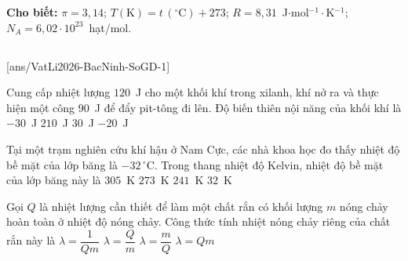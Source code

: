 \def\CheDo{solcolor}%
\def\tenchuong{Sở GD\&ĐT Bắc Ninh}
\def\thuonghieu{VẬT LÍ 12 -- Eduzy.com.vn}
\def\TachCauDS{1}
\def\TachCauLG{1}




	\noindent\textbf{Cho biết:} $\pi=3{,}14$; $T(\text{K})=t\,(^\circ\text{C})+273$; $R=8{,}31$~J$\cdot$mol$^{-1}\cdot$K$^{-1}$; $N_A=6{,}02\cdot 10^{23}$~hạt/mol.

	\noindent
	\subsection*{}
	\setcounter{ex}{0}
	[ans/VatLi2026-BacNinh-SoGD-1]

	\begin{ex}%
		Cung cấp nhiệt lượng $120$~J cho một khối khí trong xilanh, khí nở ra và thực hiện một công $90$~J để đẩy pit-tông đi lên. Độ biến thiên nội năng của khối khí là
		\choice
		{$-30$~J}
		{$210$~J}
		{\True $30$~J}
		{$-20$~J}
	\end{ex}

	\begin{ex}%
		Tại một trạm nghiên cứu khí hậu ở Nam Cực, các nhà khoa học đo thấy nhiệt độ bề mặt của lớp băng là $-32\,^\circ\text{C}$. Trong thang nhiệt độ Kelvin, nhiệt độ bề mặt của lớp băng này là
		\choice
		{$305$~K}
		{$273$~K}
		{\True $241$~K}
		{$32$~K}
	\end{ex}

	\begin{ex}%
		Gọi $Q$ là nhiệt lượng cần thiết để làm một chất rắn có khối lượng $m$ nóng chảy hoàn toàn ở nhiệt độ nóng chảy. Công thức tính nhiệt nóng chảy riêng của chất rắn này là
		\choice
		{$\lambda=\dfrac{1}{Qm}$}
		{\True $\lambda=\dfrac{Q}{m}$}
		{$\lambda=\dfrac{m}{Q}$}
		{$\lambda=Qm$}
	\end{ex}

